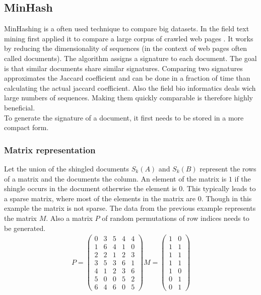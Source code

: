\subsection{MinHash}
\label{ssec:minhash}

MinHashing is a often used technique to compare big datasets. In the field text mining \citeauthor{minhash} first applied it to compare a large corpus of crawled web pages \cite{minhash}. It works by reducing the dimensionality of sequences (in the context of web pages often called documents). The algorithm assigns a signature to each document. The goal is that similar documents share similar signatures. Comparing two signatures approximates the Jaccard coefficient and can be done in a fraction of time than calculating the actual jaccard coefficient. Also the field bio informatics deals wich large numbers of sequences. Making them quickly comparable is therefore highly beneficial. \\
To generate the signature of a document, it first needs to be stored in a more compact form.

\subsubsection{Matrix representation}

Let the union of the shingled documents $ S_k(A) $ and $ S_k(B) $ represent the rows of a matrix and the documents the column. An element of the matrix is $ 1 $ if the shingle occurs in the document otherwise the element is $ 0 $. This typically leads to a sparse matrix, where most of the elements in the matrix are $ 0 $. Though in this example the matrix is not sparse. The data from the previous example represents the matrix $ M $. Also a matrix $ P $ of random permutations of row indices needs to be generated.\\

\begin{equation}
    \begin{split}
        P = 
        \begin{pmatrix}
            0 & 3 & 5 & 4 & 4 \\
            1 & 6 & 4 & 1 & 0 \\
            2 & 2 & 1 & 2 & 3 \\
            3 & 5 & 3 & 6 & 1 \\
            4 & 1 & 2 & 3 & 6 \\
            5 & 0 & 0 & 5 & 2 \\
            6 & 4 & 6 & 0 & 5
        \end{pmatrix}
        M = 
        \begin{pmatrix}
            1 & 0 \\
            1 & 1 \\
            1 & 1 \\
            1 & 1 \\
            1 & 0 \\
            0 & 1 \\
            0 & 1
        \end{pmatrix}   
    \end{split}
\end{equation} \\

